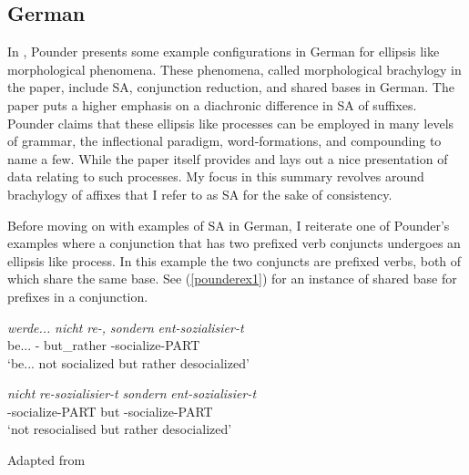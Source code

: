 \subsection{German}

In \cite{pounder2006broken}, Pounder presents some example configurations in German for ellipsis like morphological phenomena. These phenomena, called morphological brachylogy in the paper, include SA, conjunction reduction, and shared bases in German. The paper puts a higher emphasis on a diachronic difference in SA of suffixes. Pounder claims that these ellipsis like processes can be employed in many levels of grammar, the inflectional paradigm, word-formations, and compounding to name a few. While the paper itself provides and lays out a nice presentation of data relating to such processes. My focus in this summary revolves around brachylogy of affixes that I refer to as SA for the sake of consistency.

Before moving on with examples of SA in German, I reiterate one of Pounder's examples where a conjunction that has two prefixed verb conjuncts undergoes an ellipsis like process. In this example the two conjuncts are prefixed verbs, both of which share the same base. See (\ref{pounderex1}) for an instance of shared base for prefixes in a conjunction. 

\begin{exe}
    \ex \label{pounderex1}
    \begin{xlist}
        \ex \label{pounderex1a} 
        \gll 
        \textit{werde...} \textit{nicht} \textit{re-,} \textit{sondern} \textit{ent-sozialisier-t} \\ be... {\Neg} {\Pref}- but\_rather {\Pref}-socialize-PART \\
        \glt `be... not socialized but rather desocialized'
    
        \ex \label{pounderex1b}
        \gll 
        \textit{nicht} \textit{re-sozialisier-t} \textit{sondern} \textit{ent-sozialisier-t} \\ {\Neg} {\Pref}-socialize-PART but {\Pref}-socialize-PART \\
        \glt `not resocialised but rather desocialized'
    \end{xlist}
\hfill Adapted from \cite{pounder2006broken}
\end{exe}

